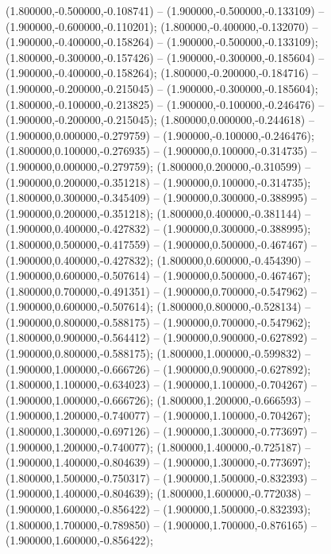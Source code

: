  (1.800000,-0.500000,-0.108741) -- (1.900000,-0.500000,-0.133109) -- (1.900000,-0.600000,-0.110201);
 (1.800000,-0.400000,-0.132070) -- (1.900000,-0.400000,-0.158264) -- (1.900000,-0.500000,-0.133109);
 (1.800000,-0.300000,-0.157426) -- (1.900000,-0.300000,-0.185604) -- (1.900000,-0.400000,-0.158264);
 (1.800000,-0.200000,-0.184716) -- (1.900000,-0.200000,-0.215045) -- (1.900000,-0.300000,-0.185604);
 (1.800000,-0.100000,-0.213825) -- (1.900000,-0.100000,-0.246476) -- (1.900000,-0.200000,-0.215045);
 (1.800000,0.000000,-0.244618) -- (1.900000,0.000000,-0.279759) -- (1.900000,-0.100000,-0.246476);
 (1.800000,0.100000,-0.276935) -- (1.900000,0.100000,-0.314735) -- (1.900000,0.000000,-0.279759);
 (1.800000,0.200000,-0.310599) -- (1.900000,0.200000,-0.351218) -- (1.900000,0.100000,-0.314735);
 (1.800000,0.300000,-0.345409) -- (1.900000,0.300000,-0.388995) -- (1.900000,0.200000,-0.351218);
 (1.800000,0.400000,-0.381144) -- (1.900000,0.400000,-0.427832) -- (1.900000,0.300000,-0.388995);
 (1.800000,0.500000,-0.417559) -- (1.900000,0.500000,-0.467467) -- (1.900000,0.400000,-0.427832);
 (1.800000,0.600000,-0.454390) -- (1.900000,0.600000,-0.507614) -- (1.900000,0.500000,-0.467467);
 (1.800000,0.700000,-0.491351) -- (1.900000,0.700000,-0.547962) -- (1.900000,0.600000,-0.507614);
 (1.800000,0.800000,-0.528134) -- (1.900000,0.800000,-0.588175) -- (1.900000,0.700000,-0.547962);
 (1.800000,0.900000,-0.564412) -- (1.900000,0.900000,-0.627892) -- (1.900000,0.800000,-0.588175);
 (1.800000,1.000000,-0.599832) -- (1.900000,1.000000,-0.666726) -- (1.900000,0.900000,-0.627892);
 (1.800000,1.100000,-0.634023) -- (1.900000,1.100000,-0.704267) -- (1.900000,1.000000,-0.666726);
 (1.800000,1.200000,-0.666593) -- (1.900000,1.200000,-0.740077) -- (1.900000,1.100000,-0.704267);
 (1.800000,1.300000,-0.697126) -- (1.900000,1.300000,-0.773697) -- (1.900000,1.200000,-0.740077);
 (1.800000,1.400000,-0.725187) -- (1.900000,1.400000,-0.804639) -- (1.900000,1.300000,-0.773697);
 (1.800000,1.500000,-0.750317) -- (1.900000,1.500000,-0.832393) -- (1.900000,1.400000,-0.804639);
 (1.800000,1.600000,-0.772038) -- (1.900000,1.600000,-0.856422) -- (1.900000,1.500000,-0.832393);
 (1.800000,1.700000,-0.789850) -- (1.900000,1.700000,-0.876165) -- (1.900000,1.600000,-0.856422);
